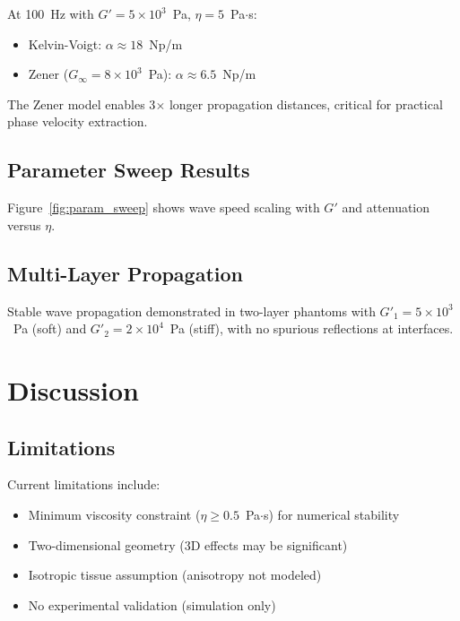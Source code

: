 \documentclass[journal,twoside,a4paper]{IEEEtran}
\begin{document}
At 100~Hz with $G' = 5 \times 10^3$~Pa, $\eta = 5$~Pa$\cdot$s:
\begin{itemize}
    \item Kelvin-Voigt: $\alpha \approx 18$~Np/m
    \item Zener ($G_\infty = 8 \times 10^3$~Pa): $\alpha \approx 6.5$~Np/m
\end{itemize}

The Zener model enables 3$\times$ longer propagation distances, 
critical for practical phase velocity extraction.

\subsection{Parameter Sweep Results}

Figure~\ref{fig:param_sweep} shows wave speed scaling with $G'$ and 
attenuation versus $\eta$.


\subsection{Multi-Layer Propagation}

Stable wave propagation demonstrated in two-layer phantoms with 
$G'_1 = 5 \times 10^3$~Pa (soft) and $G'_2 = 2 \times 10^4$~Pa (stiff), 
with no spurious reflections at interfaces.

\section{Discussion}
\label{sec:discussion}

\subsection{Limitations}

Current limitations include:
\begin{itemize}
    \item Minimum viscosity constraint ($\eta \geq 0.5$~Pa$\cdot$s) for 
    numerical stability
    \item Two-dimensional geometry (3D effects may be significant)
    \item Isotropic tissue assumption (anisotropy not modeled)
    \item No experimental validation (simulation only)
\end{itemize}
\end{document}
